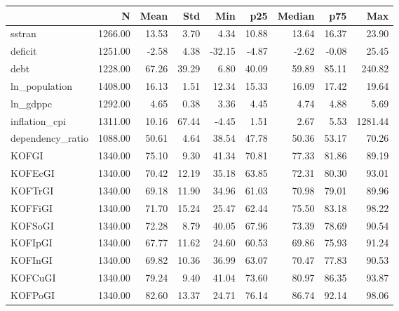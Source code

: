 \begin{tabular}{lrrrrrrrr}
\toprule
 & N & Mean & Std & Min & p25 & Median & p75 & Max \\
\midrule
sstran & 1266.00 & 13.53 & 3.70 & 4.34 & 10.88 & 13.64 & 16.37 & 23.90 \\
deficit & 1251.00 & -2.58 & 4.38 & -32.15 & -4.87 & -2.62 & -0.08 & 25.45 \\
debt & 1228.00 & 67.26 & 39.29 & 6.80 & 40.09 & 59.89 & 85.11 & 240.82 \\
ln_population & 1408.00 & 16.13 & 1.51 & 12.34 & 15.33 & 16.09 & 17.42 & 19.64 \\
ln_gdppc & 1292.00 & 4.65 & 0.38 & 3.36 & 4.45 & 4.74 & 4.88 & 5.69 \\
inflation_cpi & 1311.00 & 10.16 & 67.44 & -4.45 & 1.51 & 2.67 & 5.53 & 1281.44 \\
dependency_ratio & 1088.00 & 50.61 & 4.64 & 38.54 & 47.78 & 50.36 & 53.17 & 70.26 \\
KOFGI & 1340.00 & 75.10 & 9.30 & 41.34 & 70.81 & 77.33 & 81.86 & 89.19 \\
KOFEcGI & 1340.00 & 70.42 & 12.19 & 35.18 & 63.85 & 72.31 & 80.30 & 93.01 \\
KOFTrGI & 1340.00 & 69.18 & 11.90 & 34.96 & 61.03 & 70.98 & 79.01 & 89.96 \\
KOFFiGI & 1340.00 & 71.70 & 15.24 & 25.47 & 62.44 & 75.50 & 83.18 & 98.22 \\
KOFSoGI & 1340.00 & 72.28 & 8.79 & 40.05 & 67.96 & 73.39 & 78.69 & 90.54 \\
KOFIpGI & 1340.00 & 67.77 & 11.62 & 24.60 & 60.53 & 69.86 & 75.93 & 91.24 \\
KOFInGI & 1340.00 & 69.82 & 10.36 & 36.99 & 63.07 & 70.47 & 77.83 & 90.53 \\
KOFCuGI & 1340.00 & 79.24 & 9.40 & 41.04 & 73.60 & 80.97 & 86.35 & 93.87 \\
KOFPoGI & 1340.00 & 82.60 & 13.37 & 24.71 & 76.14 & 86.74 & 92.14 & 98.06 \\
\bottomrule
\end{tabular}
